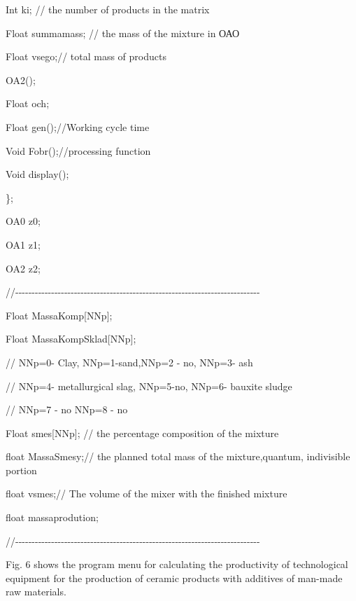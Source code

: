 Int ki; // the number of products in the matrix

Float summamass; // the mass of the mixture in ОАО

Float vsego;// total mass of products

OA2();

Float och;

Float gen();//Working cycle time

Void Fobr();//processing function

Void display();

\};

OA0 z0;

OA1 z1;

OA2 z2;

//-\/-\/-\/-\/-\/-\/-\/-\/-\/-\/-\/-\/-\/-\/-\/-\/-\/-\/-\/-\/-\/-\/-\/-\/-\/-\/-\/-\/-\/-\/-\/-\/-\/-\/-\/-\/-\/-\/-\/-\/-\/-\/-\/-\/-\/-\/-\/-\/-\/-\/-\/-\/-\/-\/-\/-\/-\/-\/-\/-\/-\/-\/-\/-\/-\/-\/-\/-\/-\/-\/-\/-\/-\/-\/-

Float MassaKomp{[}NNp{]};

Float MassaKompSklad{[}NNp{]};

// NNp=0- Clay, NNp=1-sand,NNp=2 - no, NNp=3- ash

// NNp=4- metallurgical slag, NNp=5-no, NNp=6- bauxite sludge

// NNp=7 - no NNp=8 - no

Float smes{[}NNp{]}; // the percentage composition of the mixture

float MassaSmesy;// the planned total mass of the mixture,quantum,
indivisible portion

float vsmes;// The volume of the mixer with the finished mixture

float massaprodution;

//-\/-\/-\/-\/-\/-\/-\/-\/-\/-\/-\/-\/-\/-\/-\/-\/-\/-\/-\/-\/-\/-\/-\/-\/-\/-\/-\/-\/-\/-\/-\/-\/-\/-\/-\/-\/-\/-\/-\/-\/-\/-\/-\/-\/-\/-\/-\/-\/-\/-\/-\/-\/-\/-\/-\/-\/-\/-\/-\/-\/-\/-\/-\/-\/-\/-\/-\/-\/-\/-\/-\/-\/-\/-\/-

Fig. 6 shows the program menu for calculating the productivity of
technological equipment for the production of ceramic products with
additives of man-made raw materials.

